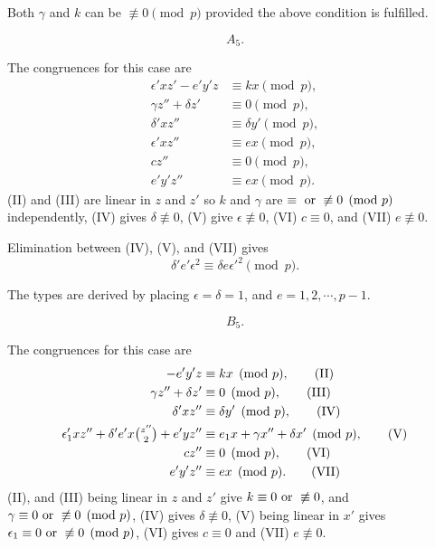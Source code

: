 \documentclass[oneside]{article}
\begin{document}
Both $\gamma$ and $k$ can be $\not\equiv 0 \pmod{p}$ provided the above
condition is fulfilled.

\medskip
\begin{equation*} A_5. \end{equation*}

The congruences for this case are
\begin{align*}
    \epsilon'xz'-e'y'z &\equiv kx        \pmod p, \tag{II} \\
\gamma z'' + \delta z' &\equiv 0         \pmod p, \tag{III} \\
           \delta'xz'' &\equiv \delta y' \pmod p, \tag{IV} \\
         \epsilon'xz'' &\equiv ex        \pmod p, \tag{V} \\
                  cz'' &\equiv 0         \pmod p, \tag{VI} \\
               e'y'z'' &\equiv ex        \pmod p. \tag{VII}
\end{align*}
\noindent (II) and (III) are linear in $z$ and $z'$ so $k$ and $\gamma$ are $\equiv
\hbox{ or } \not\equiv 0 \pmod{p}$ independently, (IV) gives $\delta \not
\equiv 0$, (V) give $\epsilon \not\equiv 0$, (VI) $c \equiv 0$, and (VII)
$e \not\equiv 0$.

Elimination between (IV), (V), and (VII) gives
\begin{equation*}
\delta'e'\epsilon^2 \equiv \delta e \epsilon'^2 \pmod{p}.
\end{equation*}

The types are derived by placing $\epsilon = \delta = 1$, and $e = 1, 2,
\cdots, p - 1$.

\begin{equation*} B_5. \end{equation*}

The congruences for this case are
\begin{align*}
                -e'y'z &\equiv kx        \pmod{p}, \tag{II} \\
\gamma z'' + \delta z' &\equiv 0         \pmod{p}, \tag{III} \\
           \delta'xz'' &\equiv \delta y' \pmod{p}, \tag{IV} \\
\epsilon'_1 xz'' + \delta'e'x\tbinom{z''}{2} + e'yz''
                       &\equiv e_1 x + \gamma x'' + \delta x'
                                         \pmod{p}, \tag{V} \\
                  cz'' &\equiv 0         \pmod{p}, \tag{VI} \\
               e'y'z'' &\equiv ex        \pmod{p}. \tag{VII}
\end{align*}
\noindent (II), and (III) being linear in $z$ and $z'$ give $k \equiv 0 \hbox{ or }
\not\equiv 0$, and $\gamma \equiv 0 \hbox{ or } \not\equiv 0 \pmod{p}$,
(IV) gives $\delta \not\equiv 0$, (V) being linear in $x'$ gives
$\epsilon_1 \equiv 0 \hbox{ or } \not\equiv 0 \pmod{p}$, (VI) gives $c
\equiv 0$ and (VII) $e \not\equiv 0$.
\end{document}
